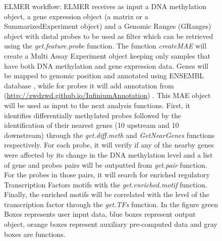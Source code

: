 \begin{figure}
    \caption[ELMER workflow]{ELMER workflow: ELMER receives as input a DNA methylation object, a gene expression object (a matrix or a SummarizedExperiment object) and a Genomic Ranges (GRanges) object with distal probes to be used as filter which can be retrieved using the \textit{get.feature.probe} function. The function \textit{createMAE}  will create a Multi Assay Experiment object keeping only samples that have both DNA methylation and gene expression data. Genes will be mapped to genomic position and annotated using ENSEMBL database \cite{doi:10.1093/database/baw093}, while for probes it will add annotation from \citeauthor{doi:10.1093/nar/gkw967} (\href{http://zwdzwd.github.io/InfiniumAnnotation}{http://zwdzwd.github.io/InfiniumAnnotation}) . This MAE object will be used as input to the next analysis functions. First, it identifies differentially methylated probes followed by the identification of their nearest genes (10 upstream and 10 downstream) through the  \textit{get.diff.meth} and  \textit{GetNearGenes} functions respectively. For each probe, it will verify if any of the nearby genes were affected by its change in the DNA methylation level and a list of  gene and probes pairs will be outputted from \textit{get.pair} function. For the probes in those pairs, it will search for enriched regulatory Transcription Factors motifs with the  \textit{get.enriched.motif} function. Finally, the  enriched motifs will be correlated with the level of the transcription factor through the \textit{get.TFs} function. In the figure green Boxes represents user input data, blue boxes represent output object, orange boxes represent auxiliary pre-computed data and gray boxes are functions.}
\label{fig:elmerworkflow}
\end{figure}
